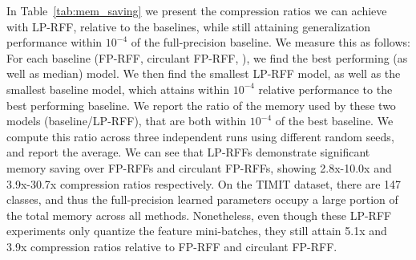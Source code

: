 In Table~\ref{tab:mem_saving} we present the compression ratios we can achieve with LP-RFF, relative to the baselines, while still attaining generalization performance within $10^{-4}$ of the full-precision baseline.  We measure this as follows:  For each baseline (FP-RFF, circulant FP-RFF, \Nystrom), we find the best performing (as well as median) model. We then find the smallest LP-RFF model, as well as the smallest baseline model, which attains within $10^{-4}$ relative performance to the best performing baseline.  We report the ratio of the memory used by these two models (baseline/LP-RFF), that are both within $10^{-4}$ of the best baseline. We compute this ratio across three independent runs using different random seeds, and report the average.  We can see that LP-RFFs demonstrate significant memory saving over FP-RFFs and circulant FP-RFFs, showing 2.8x-10.0x and 3.9x-30.7x compression ratios respectively. On the TIMIT dataset, there are 147 classes, and thus the full-precision learned parameters occupy a large portion of the total memory across all methods. Nonetheless, even though these LP-RFF experiments only quantize the feature mini-batches, they still attain 5.1x and 3.9x compression ratios relative to FP-RFF and circulant FP-RFF.

